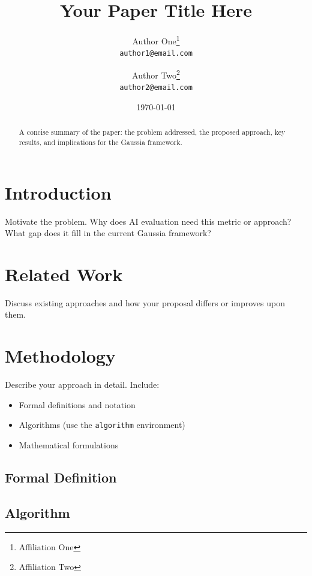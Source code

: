 \documentclass[11pt,a4paper]{article}
\title{Your Paper Title Here}
\author{
  Author One\thanks{Affiliation One} \\
  \texttt{author1@email.com}
  \and
  Author Two\thanks{Affiliation Two} \\
  \texttt{author2@email.com}
}
\date{\today}
\begin{document}
\maketitle

\begin{abstract}
  A concise summary of the paper: the problem addressed, the proposed approach,
  key results, and implications for the Gaussia framework.
\end{abstract}

\section{Introduction}

Motivate the problem. Why does AI evaluation need this metric or approach?
What gap does it fill in the current Gaussia framework?

\section{Related Work}

Discuss existing approaches and how your proposal differs or improves upon them.

\section{Methodology}

Describe your approach in detail. Include:
\begin{itemize}
  \item Formal definitions and notation
  \item Algorithms (use the \texttt{algorithm} environment)
  \item Mathematical formulations
\end{itemize}

\subsection{Formal Definition}


\subsection{Algorithm}
\end{document}
